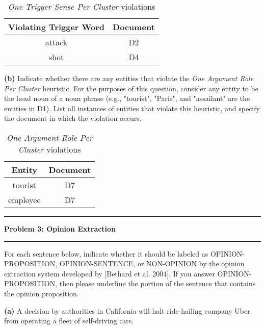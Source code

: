 \documentclass[11pt]{article}
\newcommand\question[2]{\vspace{.25in}\hrule\textbf{#1: #2}\vspace{.5em}\hrule\vspace{.10in}}
\renewcommand\part[1]{\vspace{.10in}\textbf{(#1)}}
\begin{document}
 \begin{table}[H]
\centering
{\renewcommand{\arraystretch}{1.2}%
\begin{tabular}{| c | c |}
\hline
\textbf{Violating Trigger Word} & \textbf{Document}\\
\hline
attack & D2 \\ \hline
shot & D4 \\ \hline
\end{tabular}}
\caption{\textit{One Trigger Sense Per Cluster} violations}
\end{table}

\part{b} Indicate whether there are any entities that violate the \textit{One Argument Role Per Cluster} heuristic. For the purposes of this question, consider any entity to be the head noun of a noun phrase (e.g., "tourist", "Paris", and "assailant" are the entities in D1). List all instances of entities that violate this heuristic, and specify the document in which the violation occurs.

 \begin{table}[H]
\centering
{\renewcommand{\arraystretch}{1.2}%
\begin{tabular}{| c | c |}
\hline
\textbf{Entity} & \textbf{Document}\\
\hline
tourist & D7 \\ \hline
employee & D7 \\ \hline
\end{tabular}}
\caption{\textit{One Argument Role Per Cluster} violations}
\end{table}

\question{Problem 3}{Opinion Extraction}

For each sentence below, indicate whether it should be labeled as OPINION-PROPOSITION, OPINION-SENTENCE, or NON-OPINION by the opinion extraction system developed by [Bethard et al. 2004]. If you answer OPINION-PROPOSITION, then please underline the portion of the sentence that contains the opinion proposition.

\part{a} A decision by authorities in California will halt ride-hailing company Uber from operating a fleet of self-driving cars.

\end{document}
